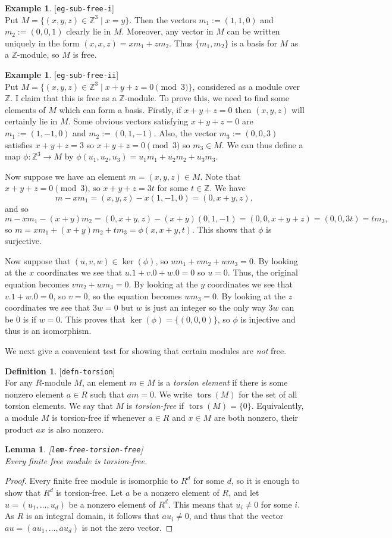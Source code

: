 \documentclass{amsart}
\newcommand{\lbl}[1]{\label{#1}\textup{[\texttt{#1}]}\ \\}
\newcommand{\lbl}{\label}
\newcommand{\tors}      {\operatorname{tors}}
\newcommand{\Z}         {{\mathbb{Z}}}
\newcommand{\xra}       {\xrightarrow}
\newcommand{\st}        {\;|\;}
\renewcommand{\:}{\colon}
\newtheorem{lemma}[theorem]{Lemma}
\theoremstyle{definition}
\newtheorem{definition}[theorem]{Definition}
\newtheorem{example}[theorem]{Example}
\begin{document}
\begin{example}\lbl{eg-sub-free-i}
 Put $M=\{(x,y,z)\in\Z^3\st x=y\}$.  Then the vectors $m_1:=(1,1,0)$
 and $m_2:=(0,0,1)$ clearly lie in $M$.  Moreover, any vector in $M$
 can be written uniquely in the form $(x,x,z)=xm_1+zm_2$.  Thus
 $\{m_1,m_2\}$ is a basis for $M$ as a $\Z$-module, so $M$ is free.
\end{example}
\begin{example}\lbl{eg-sub-free-ii}
 Put $M=\{(x,y,z)\in\Z^3\st x+y+z=0\pmod{3}\}$, considered as a module
 over $\Z$.  I claim that this is free as a $\Z$-module.  To prove
 this, we need to find some elements of $M$ which can form a basis.
 Firstly, if $x+y+z=0$ then $(x,y,z)$ will certainly lie in $M$.  Some
 obvious vectors satisfying $x+y+z=0$ are $m_1:=(1,-1,0)$ and
 $m_2:=(0,1,-1)$.  Also, the vector $m_3:=(0,0,3)$ satisfies $x+y+z=3$
 so $x+y+z=0\pmod{3}$ so $m_3\in M$.  We can thus define a map
 $\phi\:\Z^3\xra{}M$ by $\phi(u_1,u_2,u_3)=u_1m_1+u_2m_2+u_3m_3$.

 Now suppose we have an element $m=(x,y,z)\in M$.  Note that
 $x+y+z=0\pmod{3}$, so $x+y+z=3t$ for some $t\in\Z$.  We have
 \[ m-xm_1=(x,y,z)-x(1,-1,0)=(0,x+y,z), \]
 and so 
 \[ m - xm_1 - (x+y)m_2 = (0,x+y,z) - (x+y)(0,1,-1)
     = (0,0,x+y+z) = (0,0,3t) = tm_3, 
 \]
 so $m=xm_1+(x+y)m_2+tm_3=\phi(x,x+y,t)$.  This shows that $\phi$ is
 surjective.  

 Now suppose that $(u,v,w)\in\ker(\phi)$, so $um_1+vm_2+wm_3=0$.  By
 looking at the $x$ coordinates we see that $u.1+v.0+w.0=0$ so $u=0$.
 Thus, the original equation becomes $vm_2+wm_3=0$.  By looking at the
 $y$ coordinates we see that $v.1+w.0=0$, so $v=0$, so the equation
 becomes $wm_3=0$.  By looking at the $z$ coordinates we see that
 $3w=0$ but $w$ is just an integer so the only way $3w$ can be $0$ is
 if $w=0$.  This proves that $\ker(\phi)=\{(0,0,0)\}$, so $\phi$ is
 injective and thus is an isomorphism.
\end{example}

We next give a convenient test for showing that certain modules are
\emph{not} free.
\begin{definition}\lbl{defn-torsion}
 For any $R$-module $M$, an element $m\in M$ is a \emph{torsion
 element} if there is some nonzero element $a\in R$ such that $am=0$.
 We write $\tors(M)$ for the set of all torsion elements.  We say that
 $M$ is \emph{torsion-free} if $\tors(M)=\{0\}$.  Equivalently, a
 module $M$ is torsion-free if whenever $a\in R$ and $x\in M$ are both
 nonzero, their product $ax$ is also nonzero.
\end{definition}
\begin{lemma}\lbl{lem-free-torsion-free}
 Every finite free module is torsion-free.
\end{lemma}
\begin{proof}
 Every finite free module is isomorphic to $R^d$ for some $d$, so it
 is enough to show that $R^d$ is torsion-free.  Let $a$ be a nonzero
 element of $R$, and let $u=(u_1,\ldots,u_d)$ be a nonzero element of
 $R^d$.  This means that $u_i\neq 0$ for some $i$.  As $R$ is an
 integral domain, it follows that $au_i\neq 0$, and thus that the
 vector $au=(au_1,\ldots,au_d)$ is not the zero vector.  
\end{proof}
\end{document}
